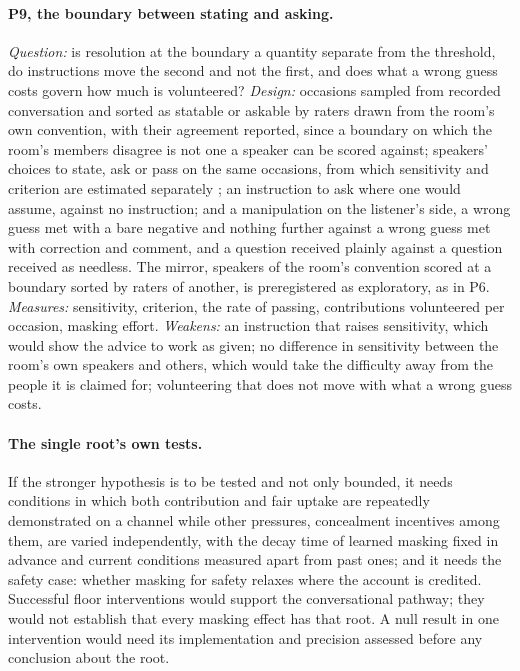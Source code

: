 \paragraph{P9, the boundary between stating and asking.} \emph{Question:} is resolution at the boundary a quantity separate from the threshold, do instructions move the second and not the first, and does what a wrong guess costs govern how much is volunteered? \emph{Design:} occasions sampled from recorded conversation and sorted as statable or askable by raters drawn from the room's own convention, with their agreement reported, since a boundary on which the room's members disagree is not one a speaker can be scored against; speakers' choices to state, ask or pass on the same occasions, from which sensitivity and criterion are estimated separately \cite{GreenSwets1966}; an instruction to ask where one would assume, against no instruction; and a manipulation on the listener's side, a wrong guess met with a bare negative and nothing further against a wrong guess met with correction and comment, and a question received plainly against a question received as needless. The mirror, speakers of the room's convention scored at a boundary sorted by raters of another, is preregistered as exploratory, as in P6. \emph{Measures:} sensitivity, criterion, the rate of passing, contributions volunteered per occasion, masking effort. \emph{Weakens:} an instruction that raises sensitivity, which would show the advice to work as given; no difference in sensitivity between the room's own speakers and others, which would take the difficulty away from the people it is claimed for; volunteering that does not move with what a wrong guess costs.

\paragraph{The single root's own tests.} If the stronger hypothesis is to be tested and not only bounded, it needs conditions in which both contribution and fair uptake are repeatedly demonstrated on a channel while other pressures, concealment incentives among them, are varied independently, with the decay time of learned masking fixed in advance and current conditions measured apart from past ones; and it needs the safety case: whether masking for safety relaxes where the account is credited. Successful floor interventions would support the conversational pathway; they would not establish that every masking effect has that root. A null result in one intervention would need its implementation and precision assessed before any conclusion about the root.

